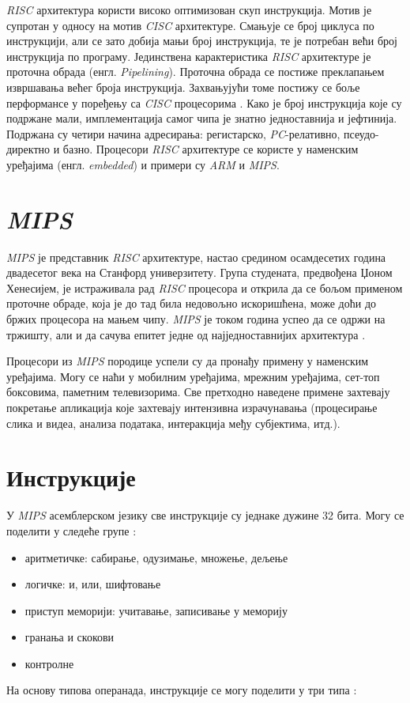 \documentclass[12pt,oneside]{memoir}
\begin{document}
\textit{RISC} архитектура користи високо оптимизован скуп инструкција. Мотив је супротан у односу на мотив
\textit{CISC} архитектуре. Смањује се број циклуса по инструкцији, али се зато добија мањи број инструкција, те је
потребан већи број инструкција по програму. Јединствена карактеристика \textit{RISC} архитектуре је проточна обрада
(енгл. \textit{Pipelining}). Проточна обрада се постиже преклапањем извршавања већег броја инструкција. Захвањујући
томе постижу се боље перформансе у поређењу са \textit{CISC} процесорима \cite{CR}. Како је број инструкција које су
подржане мали, имплементација самог чипа је знатно једноставнија и јефтинија. Подржана су четири начина адресирања:
регистарско, \textit{PC}-релативно, псеудо-директно и базно. Процесори \textit{RISC} архитектуре се користе у
наменским уређајима (енгл. \textit{embedded}) и примери су \textit{ARM} и \textit{MIPS}.

\section{\textit{MIPS}} \label{chp:MIPS}

\textit{MIPS} је представник \textit{RISC} архитектуре, настао средином осамдесетих година двадесетог века на
Станфорд универзитету. Група студената, предвођена Џоном Хенесијем, је истраживала рад \textit{RISC} процесора и
открила да се бољом применом проточне обраде, која је до тад била недовољно искоришћена, може доћи до бржих
процесора на мањем чипу. \textit{MIPS} је током година успео да се одржи на тржишту, али и да сачува епитет једне од
најједноставнијих архитектура \cite{SMR}.

Процесори из \textit{MIPS} породице успели су да пронађу примену у наменским уређајима. Могу се наћи у мобилним
уређајима, мрежним уређајима, сет-топ боксовима, паметним телевизорима. Све претходно наведене примене захтевају
покретање апликација које захтевају интензивна израчунавања (процесирање слика и видеа, анализа података,
интеракција међу субјектима, итд.).

\section{Инструкције} \label{chp:INS}

У \textit{MIPS} асемблерском језику све инструкције су једнаке дужине 32 бита. Могу се поделити у следеће групе
\cite{ISA}:

\begin{itemize}
	\item аритметичке: сабирање, одузимање, множење, дељење
	\item логичке: и, или, шифтовање
	\item приступ меморији: учитавање, записивање у меморију
	\item гранања и скокови
	\item контролне
\end{itemize}
На основу типова операнада, инструкције се могу поделити у три типа \cite{SMR}:
\end{document}
